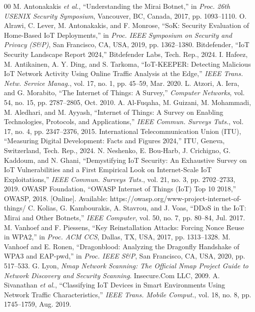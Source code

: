 \documentclass[conference]{IEEEtran}
\begin{document}
\begin{thebibliography}{00}
 M. Antonakakis \textit{et al.}, ``Understanding the Mirai Botnet,'' in \textit{Proc. 26th USENIX Security Symposium}, Vancouver, BC, Canada, 2017, pp. 1093--1110.
 O. Alrawi, C. Lever, M. Antonakakis, and F. Monrose, ``SoK: Security Evaluation of Home-Based IoT Deployments,'' in \textit{Proc. IEEE Symposium on Security and Privacy (S\&P)}, San Francisco, CA, USA, 2019, pp. 1362--1380.
 Bitdefender, ``IoT Security Landscape Report 2024,'' Bitdefender Labs, Tech. Rep., 2024.
 I. Hafeez, M. Antikainen, A. Y. Ding, and S. Tarkoma, ``IoT-KEEPER: Detecting Malicious IoT Network Activity Using Online Traffic Analysis at the Edge,'' \textit{IEEE Trans. Netw. Service Manag.}, vol. 17, no. 1, pp. 45--59, Mar. 2020.
 L. Atzori, A. Iera, and G. Morabito, ``The Internet of Things: A Survey,'' \textit{Computer Networks}, vol. 54, no. 15, pp. 2787--2805, Oct. 2010.
 A. Al-Fuqaha, M. Guizani, M. Mohammadi, M. Aledhari, and M. Ayyash, ``Internet of Things: A Survey on Enabling Technologies, Protocols, and Applications,'' \textit{IEEE Commun. Surveys Tuts.}, vol. 17, no. 4, pp. 2347--2376, 2015.
 International Telecommunication Union (ITU), ``Measuring Digital Development: Facts and Figures 2024,'' ITU, Geneva, Switzerland, Tech. Rep., 2024.
 N. Neshenko, E. Bou-Harb, J. Crichigno, G. Kaddoum, and N. Ghani, ``Demystifying IoT Security: An Exhaustive Survey on IoT Vulnerabilities and a First Empirical Look on Internet-Scale IoT Exploitations,'' \textit{IEEE Commun. Surveys Tuts.}, vol. 21, no. 3, pp. 2702--2733, 2019.
 OWASP Foundation, ``OWASP Internet of Things (IoT) Top 10 2018,'' OWASP, 2018. [Online]. Available: https://owasp.org/www-project-internet-of-things/
 C. Kolias, G. Kambourakis, A. Stavrou, and J. Voas, ``DDoS in the IoT: Mirai and Other Botnets,'' \textit{IEEE Computer}, vol. 50, no. 7, pp. 80--84, Jul. 2017.
 M. Vanhoef and F. Piessens, ``Key Reinstallation Attacks: Forcing Nonce Reuse in WPA2,'' in \textit{Proc. ACM CCS}, Dallas, TX, USA, 2017, pp. 1313--1328.
 M. Vanhoef and E. Ronen, ``Dragonblood: Analyzing the Dragonfly Handshake of WPA3 and EAP-pwd,'' in \textit{Proc. IEEE S\&P}, San Francisco, CA, USA, 2020, pp. 517--533.
 G. Lyon, \textit{Nmap Network Scanning: The Official Nmap Project Guide to Network Discovery and Security Scanning}. Insecure.Com LLC, 2009.
 A. Sivanathan \textit{et al.}, ``Classifying IoT Devices in Smart Environments Using Network Traffic Characteristics,'' \textit{IEEE Trans. Mobile Comput.}, vol. 18, no. 8, pp. 1745--1759, Aug. 2019.

\end{thebibliography}
\end{document}
